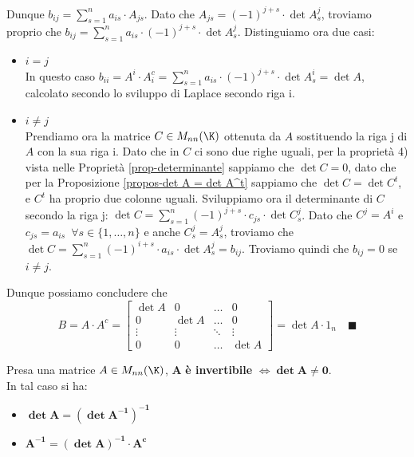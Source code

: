 \documentclass[11pt, a4paper, titlepage, oneside]{scrbook}
\begin{document}
Dunque $b_{ij} = \sum_{s = 1}^n a_{is} \cdot A_{js}$. Dato che $A_{js} = (-1)^{j+s} \cdot \det A_s^j$, troviamo proprio che \mbox{$b_{ij} = \sum_{s = 1}^n a_{is} \cdot (-1)^{j+s} \cdot \det A_s^j$}. Distinguiamo ora due casi:
\begin{itemize}
    \item $i = j$ \\
    In questo caso $b_{ii} = A^i \cdot A^c_i = \sum_{s = 1}^n a_{is} \cdot (-1)^{j+s} \cdot \det A^i_s = \det A$, calcolato secondo lo sviluppo di Laplace secondo riga i.
    \item $i \neq j$ \\
    Prendiamo ora la matrice $C \in M_{nn}(\K)$ ottenuta da $A$ sostituendo la riga j di $A$ con la sua riga i. Dato che in $C$ ci sono due righe uguali, per la proprietà 4) vista nelle Proprietà \ref{prop-determinante} sappiamo che $\det C = 0$, dato che per la Proposizione \ref{propos-det A = det A^t} sappiamo che $\det C = \det C^t$, e $C^t$ ha proprio due colonne uguali. Sviluppiamo ora il determinante di $C$ secondo la riga j: \mbox{$\det C = \sum_{s = 1}^n (-1)^{j+s} \cdot c_{js} \cdot \det C_s^j$}. Dato che $C^j = A^i$ e $c_{js} = a_{is} \enspace \forall s \in \{1, \ldots, n\}$ e anche $C^j_s = A^j_s$, troviamo che \mbox{$\det C = \sum_{s = 1}^n (-1)^{i+s} \cdot a_{is} \cdot \det A^j_s = b_{ij}$}. Troviamo quindi che $b_{ij} = 0$ se $i \neq j$.
\end{itemize}

Dunque possiamo concludere che
\[
B = A \cdot A^c = \begin{bmatrix}
    \det A & 0 & \dots & 0 \\
    0 & \det A & \dots & 0 \\
    \vdots & \vdots & \ddots & \vdots \\
    0 & 0 & \dots & \det A
\end{bmatrix} = \det A \cdot 1_n \quad \blacksquare
\]

\begin{Proposizione}[]
\label{proposizione-invertibilità-cramer}
Presa una matrice $A \in M_{nn}(\K)$, $\bm{A}$ \textbf{è invertibile} $\iff \bm{\det A \neq 0}$. \\
In tal caso si ha:
\begin{itemize}
    \item $\bm{\det A  = (\det A^{-1})^{-1}}$ 
    \item $\bm{A^{-1} = (\det A)^{-1} \cdot A^c}$
\end{itemize}

\end{Proposizione}
\end{document}
